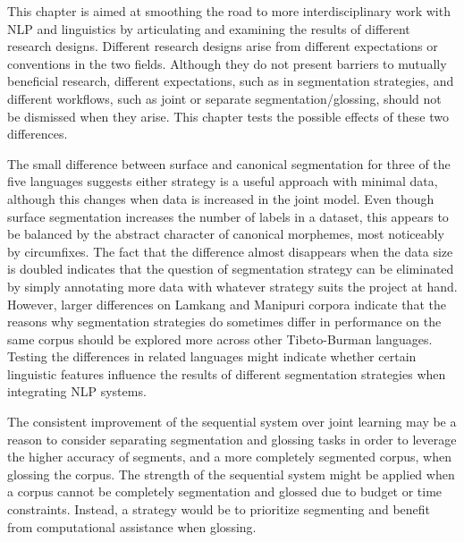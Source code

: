 This chapter is aimed at smoothing the road to more interdisciplinary work with NLP and linguistics by articulating and examining the results of different research designs. Different research designs arise from different expectations or conventions in the two fields. Although they do not present barriers to mutually beneficial research, different expectations, such as in segmentation strategies, and different workflows, such as joint or separate segmentation/glossing, should not be dismissed when they arise. This chapter tests the possible effects of these two differences.

The small difference between surface and canonical segmentation for three of the five languages suggests either strategy is a useful approach with minimal data, although this changes when data is increased in the joint model. Even though surface segmentation increases the number of labels in a dataset, this appears to be balanced by the abstract character of canonical morphemes, most noticeably by circumfixes. The fact that the difference almost disappears when the data size is doubled indicates that the question of segmentation strategy can be eliminated by simply annotating more data with whatever strategy suits the project at hand. 
However, larger differences on Lamkang and Manipuri corpora indicate that the reasons why segmentation strategies do sometimes differ in performance on the same corpus should be explored more across other Tibeto-Burman languages. Testing the differences in related languages might indicate whether certain linguistic features influence the results of different segmentation strategies when integrating NLP systems. 

The consistent improvement of the sequential system over joint learning may be a reason to consider separating segmentation and glossing tasks in order to leverage the higher accuracy of segments, and a more completely segmented corpus, when glossing the corpus. 
The strength of the sequential system might be applied when a corpus cannot be completely segmentation and glossed due to budget or time constraints. Instead, a strategy would be to prioritize segmenting and benefit from computational assistance when glossing. 

